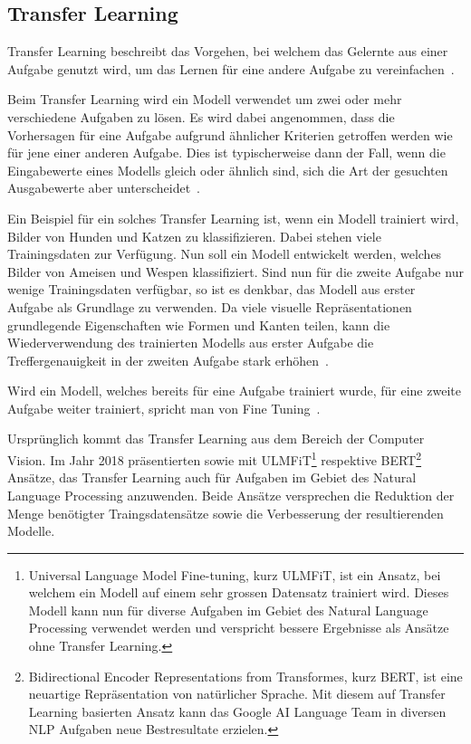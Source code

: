 \subsection{Transfer Learning}
\label{chap:transfer-learning}

Transfer Learning beschreibt das Vorgehen, bei welchem das Gelernte aus einer Aufgabe genutzt wird, um das Lernen für eine andere Aufgabe zu vereinfachen~\autocite{Goodfellow2016}.

Beim Transfer Learning wird ein Modell verwendet um zwei oder mehr verschiedene Aufgaben zu lösen. Es wird dabei angenommen, dass die Vorhersagen für eine Aufgabe aufgrund ähnlicher Kriterien getroffen werden wie für jene einer anderen Aufgabe. Dies ist typischerweise dann der Fall, wenn die Eingabewerte eines Modells gleich oder ähnlich sind, sich die Art der gesuchten Ausgabewerte aber unterscheidet~\autocite{Goodfellow2016}.

Ein Beispiel für ein solches Transfer Learning ist, wenn ein Modell trainiert wird, Bilder von Hunden und Katzen zu klassifizieren. Dabei stehen viele Trainingsdaten zur Verfügung. Nun soll ein Modell entwickelt werden, welches Bilder von Ameisen und Wespen klassifiziert. Sind nun für die zweite Aufgabe nur wenige Trainingsdaten verfügbar, so ist es denkbar, das Modell aus erster Aufgabe als Grundlage zu verwenden. Da viele visuelle Repräsentationen grundlegende Eigenschaften wie Formen und Kanten teilen, kann die Wiederverwendung des trainierten Modells aus erster Aufgabe die Treffergenauigkeit in der zweiten Aufgabe stark erhöhen~\autocite{Goodfellow2016}.

Wird ein Modell, welches bereits für eine Aufgabe trainiert wurde, für eine zweite Aufgabe weiter trainiert, spricht man von Fine Tuning~\autocite{Goodfellow2016}.

Ursprünglich kommt das Transfer Learning aus dem Bereich der Computer Vision. Im Jahr 2018 präsentierten \textcite{Howard2018} sowie \textcite{Devlin2018} mit ULMFiT\footnote{Universal Language Model Fine-tuning, kurz ULMFiT, ist ein Ansatz, bei welchem ein Modell auf einem sehr grossen Datensatz trainiert wird. Dieses Modell kann nun für diverse Aufgaben im Gebiet des Natural Language Processing verwendet werden und verspricht bessere Ergebnisse als Ansätze ohne Transfer Learning\autocite{Howard2018}.} respektive BERT\footnote{Bidirectional Encoder Representations from Transformes, kurz BERT, ist eine neuartige Repräsentation von natürlicher Sprache. Mit diesem auf Transfer Learning basierten Ansatz kann das Google AI Language Team in diversen NLP Aufgaben neue Bestresultate erzielen\autocite{Devlin2018}.} Ansätze, das Transfer Learning auch für Aufgaben im Gebiet des Natural Language Processing anzuwenden. Beide Ansätze versprechen die Reduktion der Menge benötigter Traingsdatensätze sowie die Verbesserung der resultierenden Modelle.

